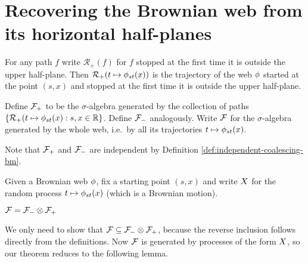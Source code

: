 \newcommand{\toinP}{\overset{\P}\to}
\newcommand{\statementoflemresampledetosampled}{$\resamplede \toinP \sampled$ as $\epsilon \to 0$}
{
\section{Recovering the Brownian web from its horizontal half-planes}

\label{recovering-from-half-planes}


\newcommand{\restrictupper}{\mathcal{R}_{+}}

\begin{definition}
  For any path $f$ write $\restrictupper(f)$ for $f$ stopped at the
  first time it is outside the upper half-plane.  Then
  $\restrictupper(t \mapsto \web{s}{t}{x})$ is the trajectory of the
  web $\phi$ started at the point $(s,x)$ and stopped at the first
  time it is outside the upper half-plane.

  Define $\mathcal{F}_{+}$ to be the $\sigma$-algebra generated by the
  collection of paths $\{\restrictupper(t \mapsto \web{s}{t}{x} : s,x
  \in \R \}$.  Define $\mathcal{F}_{-}$ analogously.
  Write $\mathcal{F}$ for the $\sigma$-algebra generated by the
  whole web, i.e.\ by all its trajectories $t \mapsto \phi_{{s}{t}}(x)$.
\end{definition}

\begin{observation}
  Note that $\mathcal{F}_{+}$ and $\mathcal{F}_{-}$ are independent by Definition
  \ref{def:independent-coalescing-bm}.
\end{observation}

\begin{notation}
Given a Brownian web $\phi$, fix a starting point $(s,x)$ and write
$X$ for the random process $t \mapsto \phi_{{s}{t}}(x)$
(which is a Brownian motion).
\end{notation}

\begin{theorem}
  $\mathcal{F} = \mathcal{F}_{-} \otimes \mathcal{F}_{+}$
\end{theorem}

We only need to show that $\mathcal{F} \subseteq \mathcal{F}_{-} \otimes \mathcal{F}_{+}$,
because the reverse inclusion follows directly from the definitions.
Now $\mathcal{F}$ is generated by processes of the form $X$,
so our theorem reduces to the following lemma.

}
